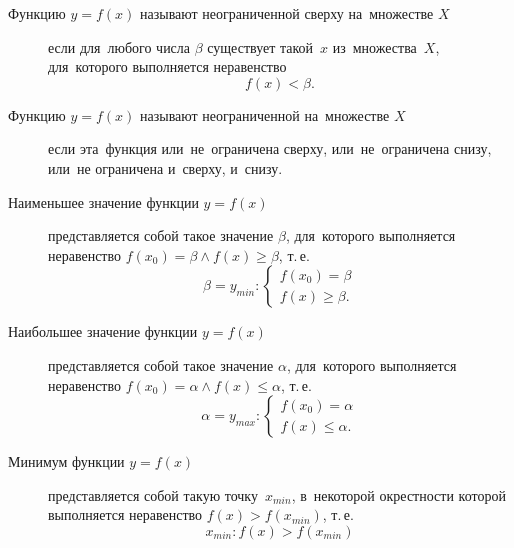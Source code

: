 \documentclass[]{scrartcl}
\begin{document}
{{\begin{description}
	\item[Функцию ${\textstyle y=f(x)}$ называют неограниченной сверху на~множестве ${\textstyle X}$] если для~любого числа ${\textstyle \beta}$ существует такой~${\textstyle x}$  из~множества~${\textstyle X}$, для~которого выполняется неравенство
	\begin{equation}\label{eq:function-5}
	f(x) < \beta.
	\end{equation}
\end{description}
\begin{description}
	\item[Функцию ${\textstyle y=f(x)}$ называют неограниченной на~множестве ${\textstyle X}$] если эта~функция или~не~ограничена сверху, или~не~ограничена снизу, или~не ограничена и~сверху, и~снизу.
\end{description}
\begin{description}
	\item[Наименьшее значение функции ${\textstyle y=f(x)}$] представляется собой такое значение ${\textstyle \beta}$, для~которого выполняется неравенство ${\textstyle f(x_0)=\beta \wedge f(x)\geq \beta}$, т.\,е.
	\begin{equation}\label{eq:function-10}
	\beta = y_{min}:
	\begin{cases}
	f(x_0)=\beta\\
	f(x)\geq \beta.
	\end{cases}
	\end{equation}
\end{description}
\begin{description}
	\item[Наибольшее значение функции ${\textstyle y=f(x)}$] представляется собой такое значение ${\textstyle \alpha}$, для~которого выполняется неравенство ${\textstyle f(x_0)=\alpha \wedge f(x)\leq \alpha}$, т.\,е.
	\begin{equation}\label{eq:function-11}
	\alpha = y_{max}:
	\begin{cases}
	f(x_0)=\alpha\\
	f(x)\leq \alpha.
	\end{cases}
	\end{equation}
\end{description}

\begin{description}
	\item[Минимум функции ${\textstyle y=f(x)}$] представляется собой такую точку~${\textstyle x_{min}}$, в~некоторой окрестности которой выполняется неравенство ${\textstyle f(x)>f(x_{min})}$, т.\,е.
	\begin{equation}\label{eq:function-12}
	x_{min}:f(x)>f(x_{min})
	\end{equation}
\end{description}

}}
\end{document}
